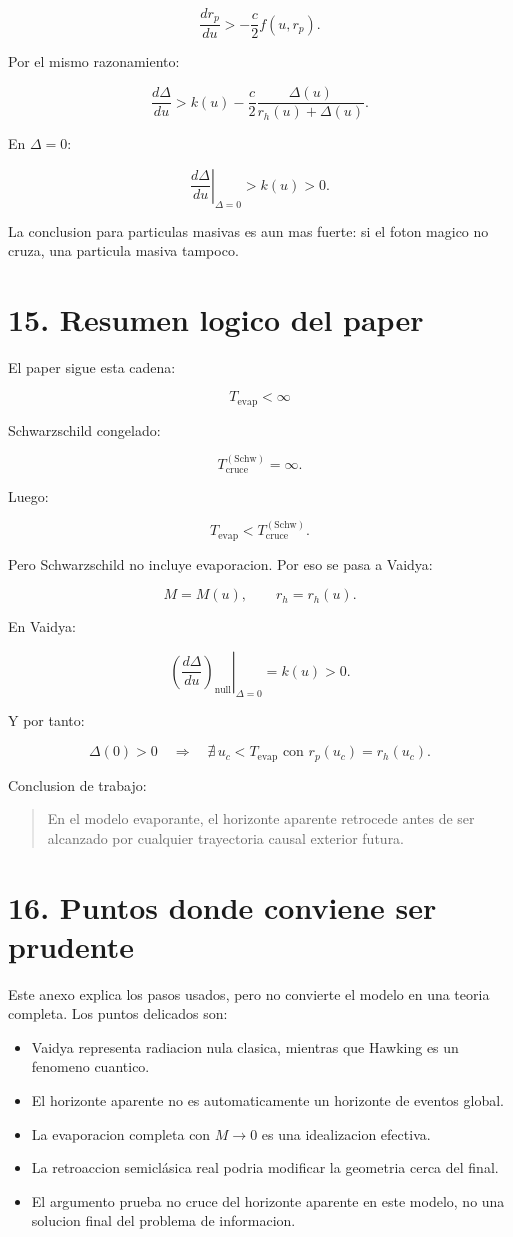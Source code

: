 ﻿\documentclass[11pt,a4paper]{article}
\begin{document}
\[
\frac{dr_p}{du}
>
-
\frac{c}{2}f(u,r_p).
\]

Por el mismo razonamiento:

\[
\frac{d\Delta}{du}
>
k(u)
-
\frac{c}{2}
\frac{\Delta(u)}{r_h(u)+\Delta(u)}.
\]

En \(\Delta=0\):

\[
\left.
\frac{d\Delta}{du}
\right|_{\Delta=0}
>
k(u)>0.
\]

La conclusion para particulas masivas es aun mas fuerte: si el foton magico no cruza, una particula masiva tampoco.

\section{15. Resumen logico del paper}

El paper sigue esta cadena:

\[
T_{\mathrm{evap}}<\infty
\]

Schwarzschild congelado:

\[
T_{\mathrm{cruce}}^{(\mathrm{Schw})}=\infty.
\]

Luego:

\[
T_{\mathrm{evap}}
<
T_{\mathrm{cruce}}^{(\mathrm{Schw})}.
\]

Pero Schwarzschild no incluye evaporacion. Por eso se pasa a Vaidya:

\[
M=M(u),
\qquad
r_h=r_h(u).
\]

En Vaidya:

\[
\left.
\left(
\frac{d\Delta}{du}
\right)_{\mathrm{null}}
\right|_{\Delta=0}
=
k(u)>0.
\]

Y por tanto:

\[
\Delta(0)>0
\quad\Longrightarrow\quad
\nexists\,u_c<T_{\mathrm{evap}}
\text{ con }
r_p(u_c)=r_h(u_c).
\]

Conclusion de trabajo:

\begin{quote}
En el modelo evaporante, el horizonte aparente retrocede antes de ser alcanzado por cualquier trayectoria causal exterior futura.
\end{quote}

\section{16. Puntos donde conviene ser prudente}

Este anexo explica los pasos usados, pero no convierte el modelo en una teoria completa. Los puntos delicados son:

\begin{itemize}
\item Vaidya representa radiacion nula clasica, mientras que Hawking es un fenomeno cuantico.
\item El horizonte aparente no es automaticamente un horizonte de eventos global.
\item La evaporacion completa con \(M\to0\) es una idealizacion efectiva.
\item La retroaccion semiclásica real podria modificar la geometria cerca del final.
\item El argumento prueba no cruce del horizonte aparente en este modelo, no una solucion final del problema de informacion.
\end{itemize}
\end{document}
